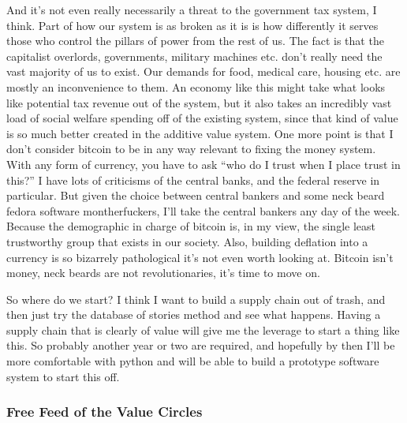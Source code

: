 And it's not even really necessarily a threat to the government tax
system, I think. Part of how our system is as broken as it is is how
differently it serves those who control the pillars of power from the
rest of us. The fact is that the capitalist overlords, governments,
military machines etc. don't really need the vast majority of us to
exist. Our demands for food, medical care, housing etc. are mostly an
inconvenience to them. An economy like this might take what looks like
potential tax revenue out of the system, but it also takes an incredibly
vast load of social welfare spending off of the existing system, since
that kind of value is so much better created in the additive value
system. One more point is that I don't consider bitcoin to be in any way
relevant to fixing the money system. With any form of currency, you have
to ask ``who do I trust when I place trust in this?'' I have lots of
criticisms of the central banks, and the federal reserve in particular.
But given the choice between central bankers and some neck beard fedora
software montherfuckers, I'll take the central bankers any day of the
week. Because the demographic in charge of bitcoin is, in my view, the
single least trustworthy group that exists in our society. Also,
building deflation into a currency is so bizarrely pathological it's not
even worth looking at. Bitcoin isn't money, neck beards are not
revolutionaries, it's time to move on.

So where do we start? I think I want to build a supply chain out of
trash, and then just try the database of stories method and see what
happens. Having a supply chain that is clearly of value will give me the
leverage to start a thing like this. So probably another year or two are
required, and hopefully by then I'll be more comfortable with python and
will be able to build a prototype software system to start this off.

\subsubsection{Free Feed of the Value
Circles}\label{free-feed-of-the-value-circles}

